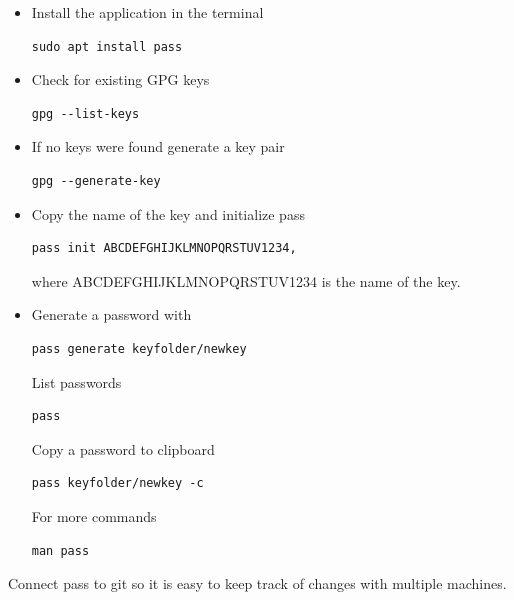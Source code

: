 \documentclass{article}
\begin{document}
\begin{itemize}
\item Install the application in the terminal \\
\begin{verbatim}
sudo apt install pass  
\end{verbatim}
\item Check for existing GPG keys \\
\begin{verbatim}
gpg --list-keys 
\end{verbatim}
\item If no keys were found generate a key pair \\
\begin{verbatim}
gpg --generate-key
\end{verbatim}
\item Copy the name of the key and initialize pass\\
\begin{verbatim}
pass init ABCDEFGHIJKLMNOPQRSTUV1234, 
\end{verbatim}
where ABCDEFGHIJKLMNOPQRSTUV1234 is the name of the key.
\item Generate a password with \\
\begin{verbatim}
pass generate keyfolder/newkey 
\end{verbatim}
List passwords
\begin{verbatim}
pass
\end{verbatim}
Copy a password to clipboard \\
\begin{verbatim}
pass keyfolder/newkey -c
\end{verbatim}
For more commands
\begin{verbatim}
man pass
\end{verbatim}
\end{itemize}

Connect pass to git so it is easy to keep track of changes with multiple machines.
\end{document}
